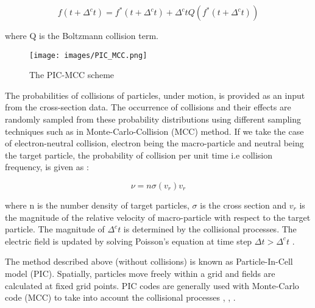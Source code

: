 \documentclass[paper=a4, fontsize=13pt]{scrartcl}
\begin{document}
\begin{equation}
f(t+\Delta^c t) = f^* (t+\Delta^c t) + \Delta^c t Q (f^* (t+\Delta^c t))
\end{equation}

where Q is the Boltzmann collision term.

\begin{figure}
\centering
\texttt{[image: images/PIC\_MCC.png]}
 \caption{The PIC-MCC scheme \cite{Birdsall1991Particle-in-cellPIC-MCC} }
  \label{fig:PIC MCC}
\end{figure}


The probabilities of collisions of particles, under motion, is provided as an input from the cross-section data. The occurrence of collisions and their effects are randomly sampled from these probability distributions using different sampling techniques such as in Monte-Carlo-Collision (MCC) method. If we take the case of electron-neutral collision, electron being the macro-particle and neutral being the target particle, the probability of collision per unit time i.e collision frequency, is given as :


\begin{equation}
\nu  = n \sigma (v_r) v_r
\end{equation}

where n is the number density of target particles, $\sigma$ is the cross section and $v_r$ is the magnitude of the relative velocity of macro-particle with respect to the target particle. The magnitude of $\Delta^c t$ is determined by the collisional processes. The electric field is updated by solving Poisson's equation at time step $\Delta t > \Delta^c t$ \cite{Chanrion2008AAir}.


The method described above (without collisions) is known as Particle-In-Cell model (PIC). Spatially, particles move freely within a grid and fields are calculated at fixed grid points. PIC codes are generally used with Monte-Carlo code (MCC) to take into account the collisional processes \cite{Birdsall1991Particle-in-cellPIC-MCC}, \cite{Chanrion2008AAir}, \cite{Teunissen20163DMixtures}. 



\end{document}
